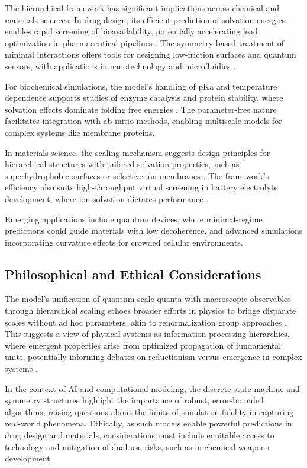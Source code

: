 \documentclass[twocolumn,prd,amsmath,amssymb,aps,superscriptaddress,nofootinbib]{revtex4-2}
\begin{document}
The hierarchical framework has significant implications across chemical and materials sciences. In drug design, its efficient prediction of solvation energies enables rapid screening of bioavailability, potentially accelerating lead optimization in pharmaceutical pipelines \cite{Jorgensen2004}. The symmetry-based treatment of minimal interactions offers tools for designing low-friction surfaces and quantum sensors, with applications in nanotechnology and microfluidics \cite{Rauscher2008}.

For biochemical simulations, the model's handling of pKa and temperature dependence supports studies of enzyme catalysis and protein stability, where solvation effects dominate folding free energies \cite{Baldwin1986}. The parameter-free nature facilitates integration with ab initio methods, enabling multiscale models for complex systems like membrane proteins.

In materials science, the scaling mechanism suggests design principles for hierarchical structures with tailored solvation properties, such as superhydrophobic surfaces or selective ion membranes \cite{Tuteja2007}. The framework's efficiency also suits high-throughput virtual screening in battery electrolyte development, where ion solvation dictates performance \cite{Xu2004}.

Emerging applications include quantum devices, where minimal-regime predictions could guide materials with low decoherence, and advanced simulations incorporating curvature effects for crowded cellular environments.

\subsection{Philosophical and Ethical Considerations}

The model's unification of quantum-scale quanta with macroscopic observables through hierarchical scaling echoes broader efforts in physics to bridge disparate scales without ad hoc parameters, akin to renormalization group approaches \cite{Wilson1975}. This suggests a view of physical systems as information-processing hierarchies, where emergent properties arise from optimized propagation of fundamental units, potentially informing debates on reductionism versus emergence in complex systems \cite{Anderson1972}.

In the context of AI and computational modeling, the discrete state machine and symmetry structures highlight the importance of robust, error-bounded algorithms, raising questions about the limits of simulation fidelity in capturing real-world phenomena. Ethically, as such models enable powerful predictions in drug design and materials, considerations must include equitable access to technology and mitigation of dual-use risks, such as in chemical weapons development.
\end{document}
